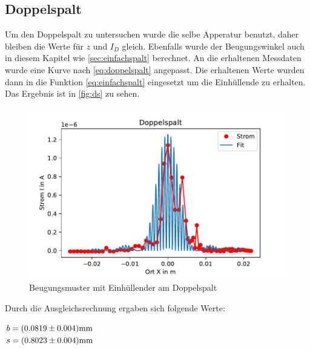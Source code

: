 \subsection{Doppelspalt}
Um den Doppelspalt zu untersuchen wurde die selbe Apperatur benutzt, daher bleiben die Werte für $z$
und $I_D$ gleich. Ebenfalls wurde der Beugungswinkel auch in diesem Kapitel wie \autoref{sec:einfachspalt}
berechnet. An die erhaltenen Messdaten wurde eine Kurve nach \autoref{eq:doppelspalt} angepasst. Die 
erhaltenen Werte wurden dann in die Funktion \autoref{eq:einfachspalt} eingesetzt um die Einhüllende zu erhalten.
Das Ergebnis ist in \autoref{fig:ds} zu sehen.
\begin{figure}
    \centering
    \includegraphics{doppelspalt.pdf}
    \caption{Beugungsmuster mit Einhüllender am Doppelspalt}
    \label{fig:dss}
  \end{figure}

Durch die Ausgleichsrechnung ergaben sich folgende Werte:
\begin{center}
    $b=(0.0819\pm 0.004)\si[]{mm}$\\
    $s=(0.8023\pm 0.004)\si[]{mm}$
\end{center}